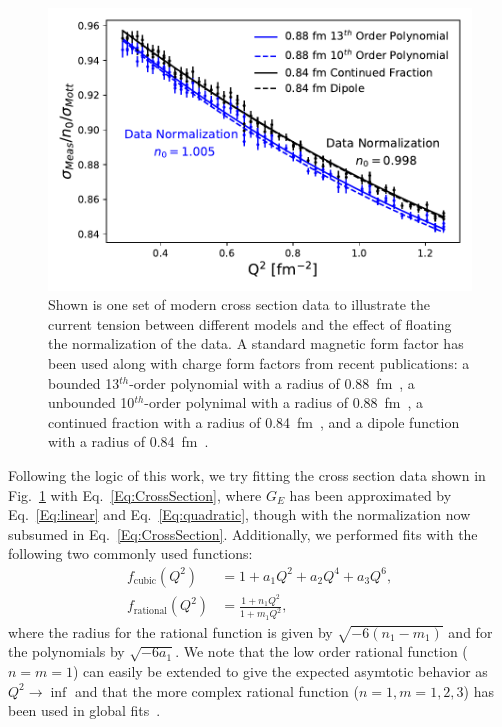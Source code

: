 \documentclass[10pt,aps,prc,twocolumn]{revtex4-1}
\begin{document}
\begin{figure}
\includegraphics[width=\columnwidth]{Figure/RealData.pdf} 
\caption{Shown is one set of modern cross section data to illustrate the current tension between 
different models and the effect of floating the normalization of the data.   A standard magnetic
form factor has been used along with charge form factors from recent publications:  a bounded
13$^{th}$-order polynomial with a radius of 0.88~fm~\cite{Ye:2017gyb}, a unbounded 10$^{th}$-order polynimal with a radius of 0.88~fm~\cite{Bernauer:2013tpr}, 
a continued fraction with a radius of 0.84~fm~\cite{Griffioen:2015hta}, and a dipole function with a radius of 0.84~fm~\cite{Higinbotham:2015rja}. }
\label{RealData}
\end{figure}

Following the logic of this work, we try fitting the cross section data shown in Fig.~\ref{RealData} with  Eq.~\ref{Eq:CrossSection}, where
$G_E$ has been approximated by Eq.~\ref{Eq:linear} and Eq.~\ref{Eq:quadratic}, though with the normalization now subsumed in Eq.~\ref{Eq:CrossSection}.    
Additionally, we performed fits with the following two commonly used functions:
\begin{align}
f_{\mathrm{cubic}}(Q^2)   & = 1 + a_1 Q^2 + a_2 Q^4 + a_3 Q^6,  \\
f_{\mathrm{rational}}(Q^2) & = \frac{1+n_1 Q^2}{1+m_1 Q^2},
\end{align}
where the radius for the rational function is given by $\sqrt{-6 (n_1 - m_1)}$ and for the polynomials by $\sqrt{-6 a_1}$.
We note that the low order rational function ($n=m=1$) can easily be extended to give the expected asymtotic behavior
as $Q^2 \to \inf$ and that the more complex rational function ($n=1,m=1,2,3$) has been used in global fits~\cite{
Kelly:2004hm,
Puckett:2017flj,   
Gutsche:2017lyu}.
\end{document}
